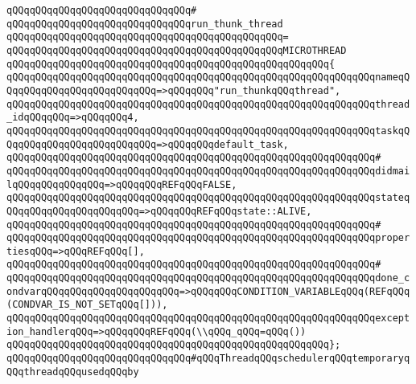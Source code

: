 \verb|qQQqqQQqqQQqqQQqqQQqqQQqqQQqqQQq#|\newline
\verb|qQQqqQQqqQQqqQQqqQQqqQQqqQQqqQQqrun_thunk_thread|\newline
\verb|qQQqqQQqqQQqqQQqqQQqqQQqqQQqqQQqqQQqqQQqqQQqqQQq=|\newline
\verb|qQQqqQQqqQQqqQQqqQQqqQQqqQQqqQQqqQQqqQQqqQQqqQQqMICROTHREAD|\newline
\verb|qQQqqQQqqQQqqQQqqQQqqQQqqQQqqQQqqQQqqQQqqQQqqQQqqQQqqQQq{|\newline
\verb|qQQqqQQqqQQqqQQqqQQqqQQqqQQqqQQqqQQqqQQqqQQqqQQqqQQqqQQqqQQqqQQqnameqQQqqQQqqQQqqQQqqQQqqQQqqQQq=>qQQqqQQq"run_thunkqQQqthread",|\newline
\verb|qQQqqQQqqQQqqQQqqQQqqQQqqQQqqQQqqQQqqQQqqQQqqQQqqQQqqQQqqQQqqQQqthread_idqQQqqQQq=>qQQqqQQq4,|\newline
\verb|qQQqqQQqqQQqqQQqqQQqqQQqqQQqqQQqqQQqqQQqqQQqqQQqqQQqqQQqqQQqqQQqtaskqQQqqQQqqQQqqQQqqQQqqQQqqQQq=>qQQqqQQqdefault_task,|\newline
\verb|qQQqqQQqqQQqqQQqqQQqqQQqqQQqqQQqqQQqqQQqqQQqqQQqqQQqqQQqqQQqqQQq#|\newline
\verb|qQQqqQQqqQQqqQQqqQQqqQQqqQQqqQQqqQQqqQQqqQQqqQQqqQQqqQQqqQQqqQQqdidmailqQQqqQQqqQQqqQQq=>qQQqqQQqREFqQQqFALSE,|\newline
\verb|qQQqqQQqqQQqqQQqqQQqqQQqqQQqqQQqqQQqqQQqqQQqqQQqqQQqqQQqqQQqqQQqstateqQQqqQQqqQQqqQQqqQQqqQQq=>qQQqqQQqREFqQQqstate::ALIVE,|\newline
\verb|qQQqqQQqqQQqqQQqqQQqqQQqqQQqqQQqqQQqqQQqqQQqqQQqqQQqqQQqqQQqqQQq#|\newline
\verb|qQQqqQQqqQQqqQQqqQQqqQQqqQQqqQQqqQQqqQQqqQQqqQQqqQQqqQQqqQQqqQQqpropertiesqQQq=>qQQqREFqQQq[],|\newline
\verb|qQQqqQQqqQQqqQQqqQQqqQQqqQQqqQQqqQQqqQQqqQQqqQQqqQQqqQQqqQQqqQQq#|\newline
\verb|qQQqqQQqqQQqqQQqqQQqqQQqqQQqqQQqqQQqqQQqqQQqqQQqqQQqqQQqqQQqqQQqdone_condvarqQQqqQQqqQQqqQQqqQQqqQQq=>qQQqqQQqCONDITION_VARIABLEqQQq(REFqQQq(CONDVAR_IS_NOT_SETqQQq[])),|\newline
\verb|qQQqqQQqqQQqqQQqqQQqqQQqqQQqqQQqqQQqqQQqqQQqqQQqqQQqqQQqqQQqqQQqexception_handlerqQQq=>qQQqqQQqREFqQQq(\\qQQq_qQQq=qQQq())|\newline
\verb|qQQqqQQqqQQqqQQqqQQqqQQqqQQqqQQqqQQqqQQqqQQqqQQqqQQqqQQq};|\newline
\newline
\verb|qQQqqQQqqQQqqQQqqQQqqQQqqQQqqQQq#qQQqThreadqQQqschedulerqQQqtemporaryqQQqthreadqQQqusedqQQqby|\newline
